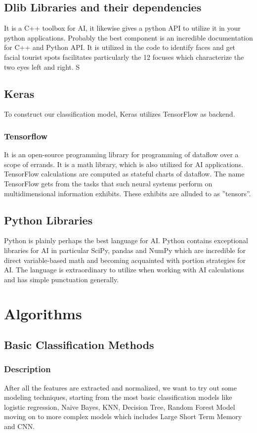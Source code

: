 \documentclass{article}
\begin{document}
 \subsection{Dlib Libraries and their dependencies}
It is a C++ toolbox for AI, it likewise gives a python API to utilize it in your python applications. Probably the best component is an incredible documentation for C++ and Python API. It is utilized in the code to identify faces and get facial tourist spots facilitates particularly the 12 focuses which characterize the two eyes left and right. S
    
\subsection{Keras}
To construct our classification model, Keras utilizes TensorFlow as backend.
\subsubsection{Tensorflow}
It is an open-source programming library for programming of dataflow over a scope
of errands. It is a math library, which is also utilized for
AI applications. TensorFlow calculations are computed as stateful charts of
dataflow. The name TensorFlow gets from the tasks that such neural systems
perform on multidimensional information exhibits. These exhibits are alluded
to as ”tensors”.
\subsection{Python Libraries}
Python is plainly perhaps the best language for AI. Python contains exceptional libraries for AI in particular SciPy, pandas and NumPy which are incredible for direct variable-based math and becoming acquainted with portion strategies for AI. The language is extraordinary to utilize when working with AI calculations and has simple punctuation generally.
\bigskip
\bigskip

\newpage
\section{Algorithms}
\subsection{Basic Classification Methods}
\subsubsection{Description}
After all the features are extracted and normalized, we want to try out some modeling techniques, starting from the most basic classification models like logistic regression, Naive Bayes, KNN, Decision Tree, Random Forest Model moving on to more complex models which includes Large Short Term Memory and CNN.
\end{document}
